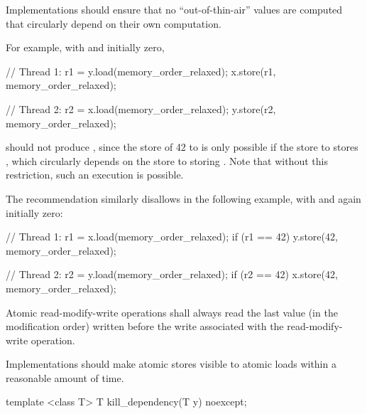 \pnum
Implementations should ensure that no ``out-of-thin-air'' values are computed that
circularly depend on their own computation.

\begin{note} For example, with  and  initially zero,

\begin{codeblock}
// Thread 1:
r1 = y.load(memory_order_relaxed);
x.store(r1, memory_order_relaxed);
\end{codeblock}

\begin{codeblock}
// Thread 2:
r2 = x.load(memory_order_relaxed);
y.store(r2, memory_order_relaxed);
\end{codeblock}

should not produce , since the store of 42 to  is only
possible if the store to  stores , which circularly depends on the
store to  storing . Note that without this restriction, such an
execution is possible.
\end{note}

\pnum
\begin{note} The recommendation similarly disallows  in the
following example, with  and  again initially zero:

\begin{codeblock}
// Thread 1:
r1 = x.load(memory_order_relaxed);
if (r1 == 42) y.store(42, memory_order_relaxed);
\end{codeblock}

\begin{codeblock}
// Thread 2:
r2 = y.load(memory_order_relaxed);
if (r2 == 42) x.store(42, memory_order_relaxed);
\end{codeblock}

\end{note}

\pnum
Atomic read-modify-write operations shall always read the last value
(in the modification order) written before the write associated with
the read-modify-write operation.

\pnum
Implementations should make atomic stores visible to atomic loads within a reasonable
amount of time.

%
\begin{itemdecl}
template <class T>
  T kill_dependency(T y) noexcept;
\end{itemdecl}

